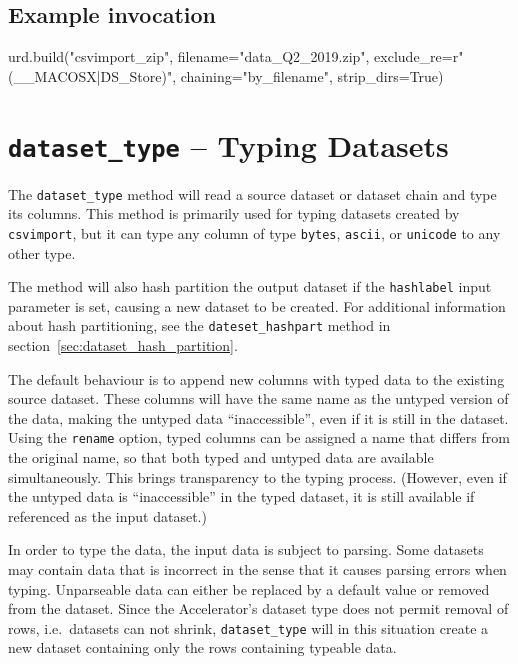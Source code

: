 \subsection{Example invocation}

\begin{python}
urd.build("csvimport_zip",
    filename="data_Q2_2019.zip",
    exclude_re=r"(__MACOSX|\.DS_Store)",
    chaining="by_filename",
    strip_dirs=True)
\end{python}



\clearpage
\section{\texttt{dataset\_type} -- Typing Datasets}
The \texttt{dataset\_type} method will read a source dataset or
dataset chain and type its columns.  This method is primarily used for
typing datasets created by \texttt{csvimport}, but it can type any
column of type \texttt{bytes}, \texttt{ascii}, or \texttt{unicode} to
any other type.

The method will also hash partition the output dataset if the
\texttt{hashlabel} input parameter is set, causing a new dataset to be
created.  For additional information about hash partitioning, see the
\texttt{dateset\_hashpart} method in section~\ref{sec:dataset_hash_partition}.

The default behaviour is to append new columns with typed data to the
existing source dataset.  These columns will have the same name as the
untyped version of the data, making the untyped data ``inaccessible'',
even if it is still in the dataset.  Using the \texttt{rename} option,
typed columns can be assigned a name that differs from the original
name, so that both typed and untyped data are available
simultaneously.  This brings transparency to the typing process.
(However, even if the untyped data is ``inaccessible'' in the typed
dataset, it is still available if referenced as the input dataset.)

In order to type the data, the input data is subject to parsing.  Some
datasets may contain data that is incorrect in the sense that it
causes parsing errors when typing.  Unparseable data can either be
replaced by a default value or removed from the dataset.  Since the
Accelerator's dataset type does not permit removal of rows,
i.e.\ datasets can not shrink, \texttt{dataset\_type} will in this
situation create a new dataset containing only the rows containing
typeable data.

